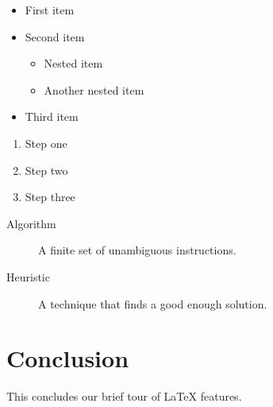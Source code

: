 \documentclass[12pt,a4paper]{article}
\theoremstyle{definition}
\begin{document}
\begin{itemize}
	\item First item
	\item Second item
	      \begin{itemize}
		      \item Nested item
		      \item Another nested item
	      \end{itemize}
	\item Third item
\end{itemize}

\begin{enumerate}
	\item Step one
	\item Step two
	\item Step three
\end{enumerate}

\begin{description}
	\item[Algorithm] A finite set of unambiguous instructions.
	\item[Heuristic] A technique that finds a good enough solution.
\end{description}

\section{Conclusion}

This concludes our brief tour of \LaTeX{} features.
\end{document}
